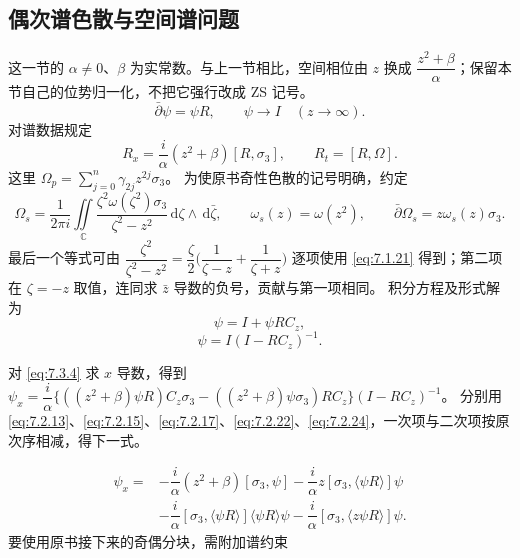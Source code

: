 \documentclass[lang=cn,scheme=chinese,mode=simple,device=normal,color=blue,math=cm,thmcnt=section,12pt]{elegantbook}
\newcommand{\dd}{\,\mathrm{d}}
\newcommand{\eqq}[2]{\tag{#1}\label{eq:#1}#2}
\begin{document}
\subsection{偶次谱色散与空间谱问题}
这一节的 $\alpha\ne0$、$\beta$ 为实常数。与上一节相比，空间相位由 $z$ 换成 $\dfrac{z^2+\beta}{\alpha}$；保留本节自己的位势归一化，不把它强行改成 ZS 记号。
\begin{equation}
\eqq{7.3.1}{\bar\partial\psi=\psi R,\qquad \psi\to I\quad(z\to\infty).}
\end{equation}
对谱数据规定
\begin{equation}
\eqq{7.3.2}{R_x=\dfrac{i}{\alpha}(z^2+\beta)[R,\sigma_3],\qquad R_t=[R,\Omega].}
\end{equation}
这里 $\Omega_p=\displaystyle\sum\limits_{j=0}^n\gamma_{2j}z^{2j}\sigma_3$。
为使原书奇性色散的记号明确，约定
\[
\Omega_s=\dfrac{1}{2\pi i}\iint\limits_{\mathbb C}
\dfrac{\zeta^2\omega(\zeta^2)\sigma_3}{\zeta^2-z^2}\dd\zeta\wedge\dd\bar\zeta,
\qquad \omega_s(z)=\omega(z^2),\qquad \bar\partial\Omega_s=z\omega_s(z)\sigma_3.
\]
最后一个等式可由
$\dfrac{\zeta^2}{\zeta^2-z^2}=\dfrac{\zeta}{2}\bigl(\dfrac{1}{\zeta-z}+\dfrac{1}{\zeta+z}\bigr)$
逐项使用 \eqref{eq:7.1.21} 得到；第二项在 $\zeta=-z$ 取值，连同求 $\bar z$ 导数的负号，贡献与第一项相同。
积分方程及形式解为
\begin{equation}
\eqq{7.3.3}{\psi=I+\psi RC_z,}
\end{equation}
\begin{equation}
\eqq{7.3.4}{\psi=I(I-RC_z)^{-1}.}
\end{equation}
\begin{callout}
对 \eqref{eq:7.3.4} 求 $x$ 导数，得到
$\psi_x=\dfrac{i}{\alpha}\{((z^2+\beta)\psi R)C_z\sigma_3-
((z^2+\beta)\psi\sigma_3)RC_z\}(I-RC_z)^{-1}$。
分别用 \eqref{eq:7.2.13}、\eqref{eq:7.2.15}、\eqref{eq:7.2.17}、\eqref{eq:7.2.22}、\eqref{eq:7.2.24}，一次项与二次项按原次序相减，得下一式。
\end{callout}
\begin{equation}
\eqq{7.3.5}{\begin{aligned}
\psi_x={}&-\dfrac{i}{\alpha}(z^2+\beta)[\sigma_3,\psi]
-\dfrac{i}{\alpha}z[\sigma_3,\langle\psi R\rangle]\psi\\
&-\dfrac{i}{\alpha}[\sigma_3,\langle\psi R\rangle]\langle\psi R\rangle\psi
-\dfrac{i}{\alpha}[\sigma_3,\langle z\psi R\rangle]\psi.
\end{aligned}}
\end{equation}
要使用原书接下来的奇偶分块，需附加谱约束
\end{document}
